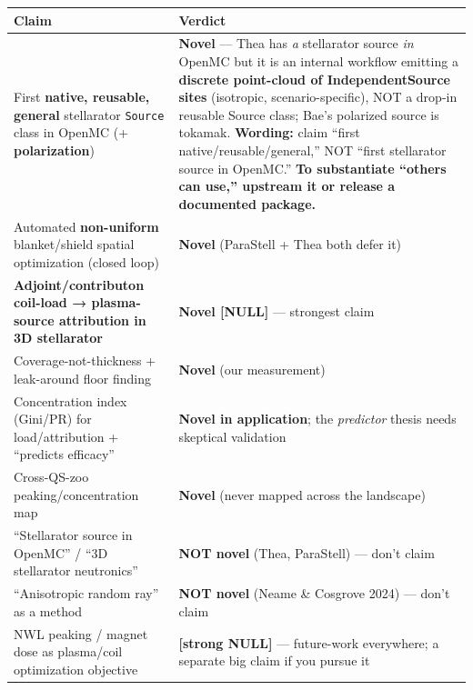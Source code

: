 \documentclass[
]{article}
\begin{document}
\begin{longtable}[]{@{}
  >{\raggedright\arraybackslash}p{}
  >{\raggedright\arraybackslash}p{}@{}}
\toprule\noalign{}
\begin{minipage}[b]{\linewidth}\raggedright
Claim
\end{minipage} & \begin{minipage}[b]{\linewidth}\raggedright
Verdict
\end{minipage} \\
\midrule\noalign{}
\endhead
\bottomrule\noalign{}
\endlastfoot
First \textbf{native, reusable, general} stellarator \texttt{Source}
class in OpenMC (+ \textbf{polarization}) & \textbf{Novel} --- Thea has
\emph{a} stellarator source \emph{in} OpenMC but it is an internal
workflow emitting a \textbf{discrete point-cloud of IndependentSource
sites} (isotropic, scenario-specific), NOT a drop-in reusable Source
class; Bae's polarized source is tokamak. \textbf{Wording:} claim
``first native/reusable/general,'' NOT ``first stellarator source in
OpenMC.'' \textbf{To substantiate ``others can use,'' upstream it or
release a documented package.} \\
Automated \textbf{non-uniform} blanket/shield spatial optimization
(closed loop) & \textbf{Novel} (ParaStell + Thea both defer it) \\
\textbf{Adjoint/contributon coil-load → plasma-source attribution in 3D
stellarator} & \textbf{Novel {[}NULL{]}} --- strongest claim \\
Coverage-not-thickness + leak-around floor finding & \textbf{Novel} (our
measurement) \\
Concentration index (Gini/PR) for load/attribution + ``predicts
efficacy'' & \textbf{Novel in application}; the \emph{predictor} thesis
needs skeptical validation \\
Cross-QS-zoo peaking/concentration map & \textbf{Novel} (never mapped
across the landscape) \\
``Stellarator source in OpenMC'' / ``3D stellarator neutronics'' &
\textbf{NOT novel} (Thea, ParaStell) --- don't claim \\
``Anisotropic random ray'' as a method & \textbf{NOT novel} (Neame \&
Cosgrove 2024) --- don't claim \\
NWL peaking / magnet dose as plasma/coil optimization objective &
\textbf{{[}strong NULL{]}} --- future-work everywhere; a separate big
claim if you pursue it \\
\end{longtable}
\end{document}
